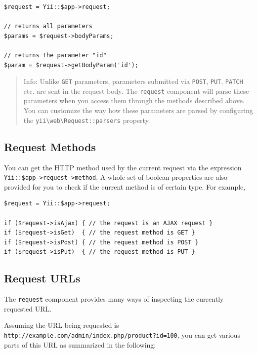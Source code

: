 \lstset{language=php}\begin{lstlisting}
$request = Yii::$app->request;

// returns all parameters
$params = $request->bodyParams;

// returns the parameter "id"
$param = $request->getBodyParam('id');
\end{lstlisting}
\begin{quote}Info: Unlike \lstinline|GET| parameters, parameters submitted via \lstinline|POST|, \lstinline|PUT|, \lstinline|PATCH| etc. are sent in the request body.
  The \lstinline|request| component will parse these parameters when you access them through the methods described above.
  You can customize the way how these parameters are parsed by configuring the \texttt{yii{\allowbreak{}\textbackslash}web{\allowbreak{}\textbackslash}Request\allowbreak{}::\allowbreak{}parsers} property.

\end{quote}
\subsection{Request Methods \label{runtime-requests.md::request-methods}}
You can get the HTTP method used by the current request via the expression \lstinline|Yii::$app->request->method|.
A whole set of boolean properties are also provided for you to check if the current method is of certain type.
For example,

\lstset{language=php}\begin{lstlisting}
$request = Yii::$app->request;

if ($request->isAjax) { // the request is an AJAX request }
if ($request->isGet)  { // the request method is GET }
if ($request->isPost) { // the request method is POST }
if ($request->isPut)  { // the request method is PUT }
\end{lstlisting}
\subsection{Request URLs \label{runtime-requests.md::request-urls}}
The \lstinline|request| component provides many ways of inspecting the currently requested URL. 

Assuming the URL being requested is \lstinline|http://example.com/admin/index.php/product?id=100|, you can get various
parts of this URL as summarized in the following:

